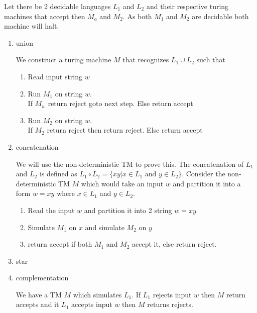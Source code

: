 \documentclass[12pt]{exam}
\begin{document}
\begin{questions}
  \begin{solution}
    Let there be 2 decidable languages $L_{1}$ and $L_{2}$ and their respective turing machines that accept then $M_{a}$ and $M_{2}$.
    As both $M_{1}$ and $M_{2}$ are decidable both machine will halt.

    \begin{enumerate}
      \item union

            We construct a turing machine $M$ that recognizes $L_{1}\cup L_{2}$ such that

            \begin{enumerate}[i]
            \item Read input string $w$
            \item  Run $M_{1}$ on string $w$.\\
                    \null \quad If $M_{w}$ return reject goto next step. Else return accept
            \item Run $M_{2}$ on string $w$.\\
                    \null \quad If $M_{2}$ return reject then return reject. Else return accept

            \end{enumerate}


      \item concatenation

            We will use the non-deterministic TM to prove this. The concatenation of $L_{1}$ and $ L_{2}$ is defined as $L_{1}\circ L_{2} = \{xy| x\in L_{1} \text{ and } y\in L_{2}\}$.
            Consider the non-deterministic TM $M$ which would take an input $w$ and partition it into a form $w = xy$ where $x \in L_{1}$ and $y\in L_{2}$.

            \begin{enumerate}[i]
              \item Read the input $w$ and partition it into 2 string $w = xy$
              \item Simulate $M_{1}$ on $x$ and simulate $M_{2}$ on $y$
              \item return accept if both $M_{1}$ and $M_{2}$ accept it, else return reject.
            \end{enumerate}

      \item star

      \item complementation

            We have a TM $M$ which simulates $L_{1}$. If $L_{1}$ rejects input $w$ then $M$ return accepts and it $L_{1}$ accepts input $w$ then $M$ returns rejects.


\end{enumerate}
\end{solution}
\end{questions}
\end{document}
